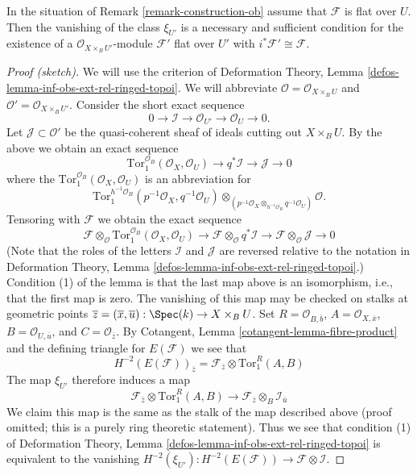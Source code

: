 \begin{lemma}
\label{lemma-ob-is-obstruction}
In the situation of Remark \ref{remark-construction-ob} assume that
$\mathcal{F}$ is flat over $U$. Then the vanishing of the class
$\xi_{U'}$ is a necessary and sufficient condition for the existence of a
$\mathcal{O}_{X \times_B U'}$-module $\mathcal{F}'$ flat over $U'$
with $i^*\mathcal{F}' \cong \mathcal{F}$.
\end{lemma}

\begin{proof}[Proof (sketch)]
We will use the criterion of
Deformation Theory, Lemma \ref{defos-lemma-inf-obs-ext-rel-ringed-topoi}.
We will abbreviate $\mathcal{O} = \mathcal{O}_{X \times_B U}$ and
$\mathcal{O}' = \mathcal{O}_{X \times_B U'}$.
Consider the short exact sequence
$$
0 \to \mathcal{I} \to \mathcal{O}_{U'} \to \mathcal{O}_U \to 0.
$$
Let $\mathcal{J} \subset \mathcal{O}'$ be the quasi-coherent
sheaf of ideals cutting out $X \times_B U$. By the above we obtain an exact
sequence
$$
\text{Tor}_1^{\mathcal{O}_B}(\mathcal{O}_X, \mathcal{O}_U) \to
q^*\mathcal{I} \to \mathcal{J} \to 0
$$
where the $\text{Tor}_1^{\mathcal{O}_B}(\mathcal{O}_X, \mathcal{O}_U)$
is an abbreviation for
$$
\text{Tor}_1^{h^{-1}\mathcal{O}_B}(p^{-1}\mathcal{O}_X, q^{-1}\mathcal{O}_U)
\otimes_{(p^{-1}\mathcal{O}_X\otimes_{h^{-1}\mathcal{O}_B}q^{-1}\mathcal{O}_U)}
\mathcal{O}.
$$
Tensoring with $\mathcal{F}$ we obtain the exact sequence
$$
\mathcal{F} \otimes_\mathcal{O}
\text{Tor}_1^{\mathcal{O}_B}(\mathcal{O}_X, \mathcal{O}_U) \to
\mathcal{F} \otimes_\mathcal{O}
q^*\mathcal{I} \to
\mathcal{F} \otimes_\mathcal{O} \mathcal{J} \to 0
$$
(Note that the roles of the letters $\mathcal{I}$ and $\mathcal{J}$
are reversed relative to the notation in
Deformation Theory, Lemma \ref{defos-lemma-inf-obs-ext-rel-ringed-topoi}.)
Condition (1) of the lemma is that the last map above is an
isomorphism, i.e., that the first map is zero.
The vanishing of this map may be checked on stalks at geometric points 
$\overline{z} = (\overline{x}, \overline{u}) : \Spec(k) \to X \times_B U$.
Set $R = \mathcal{O}_{B, \overline{b}}$, $A = \mathcal{O}_{X, \overline{x}}$,
$B = \mathcal{O}_{U, \overline{u}}$, and
$C = \mathcal{O}_{\overline{z}}$.
By Cotangent, Lemma \ref{cotangent-lemma-fibre-product}
and the defining triangle for $E(\mathcal{F})$ we see that
$$
H^{-2}(E(\mathcal{F}))_{\overline{z}} =
\mathcal{F}_{\overline{z}} \otimes \text{Tor}_1^R(A, B)
$$
The map $\xi_{U'}$ therefore induces a map
$$
\mathcal{F}_{\overline{z}} \otimes \text{Tor}_1^R(A, B)
\longrightarrow
\mathcal{F}_{\overline{z}} \otimes_B \mathcal{I}_{\overline{u}}
$$
We claim this map is the same as the stalk of the map described above
(proof omitted; this is a purely ring theoretic statement).
Thus we see that condition (1) of 
Deformation Theory, Lemma \ref{defos-lemma-inf-obs-ext-rel-ringed-topoi}
is equivalent to the vanishing
$H^{-2}(\xi_{U'}) :
H^{-2}(E(\mathcal{F})) \to \mathcal{F} \otimes \mathcal{I}$.


\end{proof}
